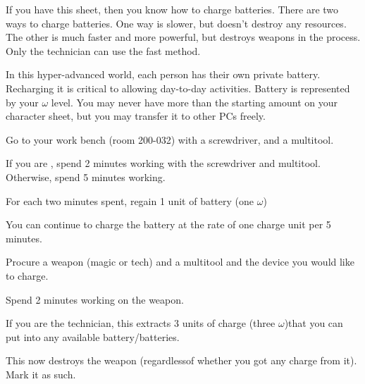 \documentclass[green]{guildcamp3}
\begin{document}
\name{\gBatterycharge{}}



If you have this sheet, then you know how to charge batteries. There are two ways to charge batteries. One way is slower, but doesn't destroy any resources. The other is much faster and more powerful, but destroys weapons in the process. Only the technician can use the fast method. 

In this hyper-advanced world, each person has their own private battery. Recharging it is critical to allowing day-to-day activities. Battery is represented by your $\omega$ level. You may never have more than the starting amount on your character sheet, but you may transfer it to other PCs freely.


\begin{enum}
  \item Go to your work bench (room 200-032) with a screwdriver, and a multitool.
  \item If you are \cTech{}, spend 2 minutes working with the screwdriver and multitool. Otherwise, spend 5 minutes working.
  \item For each two minutes spent, regain 1 unit of battery (one $\omega$)
  \item You can continue to charge the battery at the rate of one charge unit per 5 minutes. 
\end{enum}

\begin{enum}
	\item Procure a weapon (magic or tech) and a multitool and the device you would like to charge.
	\item Spend 2 minutes working on the weapon. 
	\item If you are the technician, this extracts 3 units of charge (three $\omega$)that you can put into any available battery/batteries. 
	\item This now destroys the weapon (regardlessof whether you got any charge from it). Mark it as such. 
\end{enum}
\end{document}
